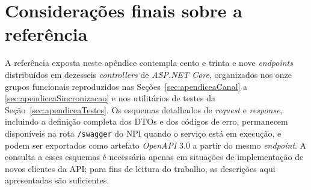 \section{Considerações finais sobre a referência}\label{sec:apendiceaConsideracoes}

A referência exposta neste apêndice contempla cento e trinta e nove \textit{endpoints} distribuídos em dezesseis \textit{controllers} de \textit{ASP.NET Core}, organizados nos onze grupos funcionais reproduzidos nas Seções~\ref{sec:apendiceaCanal} a \ref{sec:apendiceaSincronizacao} e nos utilitários de testes da Seção~\ref{sec:apendiceaTestes}. Os esquemas detalhados de \textit{request} e \textit{response}, incluindo a definição completa dos DTOs e dos códigos de erro, permanecem disponíveis na rota \texttt{/swagger} do NPI quando o serviço está em execução, e podem ser exportados como artefato \textit{OpenAPI} 3.0 a partir do mesmo \textit{endpoint}. A consulta a esses esquemas é necessária apenas em situações de implementação de novos clientes da API; para fins de leitura do trabalho, as descrições aqui apresentadas são suficientes.
